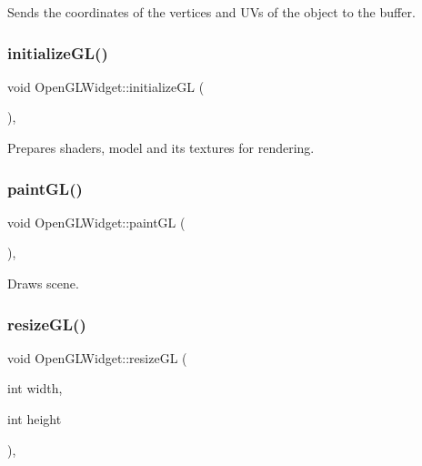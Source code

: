 Sends the coordinates of the vertices and UV\textquotesingle{}s of the object to the buffer. 

\mbox{\label{class_open_g_l_widget_a4baa372aec232a8d6c153cdef540dc11}} 
\subsubsection{initialize\+G\+L()}
{\footnotesize\ttfamily void Open\+G\+L\+Widget\+::initialize\+GL (\begin{DoxyParamCaption}{ }\end{DoxyParamCaption})\hspace{0.3cm}{\ttfamily [override]}, {\ttfamily [protected]}}



Prepares shaders, model and it\textquotesingle{}s textures for rendering. 

\mbox{\label{class_open_g_l_widget_a86df33a6b58b77588ffb1c110fcf2932}} 
\subsubsection{paint\+G\+L()}
{\footnotesize\ttfamily void Open\+G\+L\+Widget\+::paint\+GL (\begin{DoxyParamCaption}{ }\end{DoxyParamCaption})\hspace{0.3cm}{\ttfamily [override]}, {\ttfamily [protected]}}



Draws scene. 

\mbox{\label{class_open_g_l_widget_a1bdb72bca1dda9243983c71c8a3e0157}} 
\subsubsection{resize\+G\+L()}
{\footnotesize\ttfamily void Open\+G\+L\+Widget\+::resize\+GL (\begin{DoxyParamCaption}\item[{int}]{width,  }\item[{int}]{height }\end{DoxyParamCaption})\hspace{0.3cm}{\ttfamily [override]}, {\ttfamily [protected]}}




